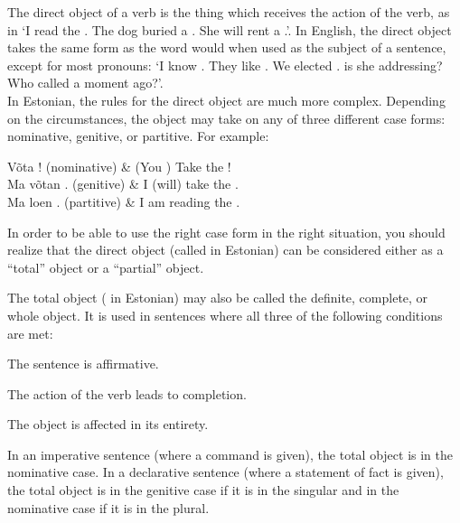 \newLesson %

\Grammar %


\newSection The direct object of a verb is the thing which receives the action of the verb, as in `I read the . The dog buried a . She will rent a .'. In English, the direct object takes the same form as the word would when used as the subject of a sentence, except for most pronouns: `I know . They like . We elected .  is she addressing? Who called  a moment ago?'. \\

In Estonian, the rules for the direct object are much more complex. Depending on the circumstances, the object may take on any of three different case forms: nominative, genitive, or partitive. For example:

	\twoColumnsTable
	Võta ! \small{(nominative)} 		& (You \sing) Take the ! \\
	Ma võtan . \small{(genitive)}  	&	I (will) take the . \\
	Ma loen . \small{(partitive)} 	&	I am reading the .
	\tableEnd

In order to be able to use the right case form in the right situation, you should realize that the direct object (called  in Estonian) can be considered either as a ``total'' object or a ``partial'' object.


\newSection The total object ( in Estonian) may also be called the definite, complete, or whole object. It is used in sentences where all three of the following conditions are met:

	\enumerateBegin
	\item The sentence is affirmative.
	\item The action of the verb leads to completion.
	\item The object is affected in its entirety.
	\enumerateEnd

\newSection In an imperative sentence (where a command is given), the total object is in the nominative case. In a declarative sentence (where a statement of fact is given), the total object is in the genitive case if it is in the singular and in the nominative case if it is in the plural.

